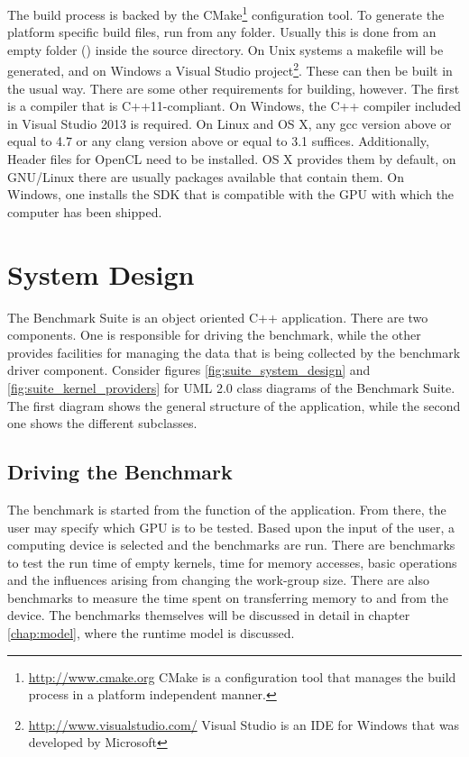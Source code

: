 The build process is backed by the CMake\footnote{\url{http://www.cmake.org} CMake is a configuration tool that manages the build process in a platform independent manner.} configuration tool. To generate the platform specific build files, run  from any folder. Usually this is done from an empty folder () inside the source directory. On Unix systems a makefile will be generated, and on Windows a Visual Studio project\footnote{\url{http://www.visualstudio.com/} Visual Studio is an IDE for Windows that was developed by Microsoft}. These can then be built in the usual way. There are some other requirements for building, however. The first is a compiler that is C++11-compliant. On Windows, the C++ compiler included in Visual Studio 2013 is required. On Linux and OS X, any gcc version above or equal to 4.7 or any clang version above or equal to 3.1 suffices. Additionally, Header files for OpenCL need to be installed. OS X provides them by default, on GNU/Linux there are usually packages available that contain them. On Windows, one installs the SDK that is compatible with the GPU with which the computer has been shipped. 
\newpage



\section{System Design}
\label{sect:suite_design}
The Benchmark Suite is an object oriented C++ application. There are two components. One is responsible for driving the benchmark, while the other provides facilities for managing the data that is being collected by the benchmark driver component. Consider figures \ref{fig:suite_system_design} and \ref{fig:suite_kernel_providers} for UML 2.0 class diagrams of the Benchmark Suite. The first diagram shows the general structure of the application, while the second one shows the different  subclasses.

\subsection{Driving the Benchmark}
\label{sect:suite_design_driver}

The benchmark is started from the  function of the application. From there, the user may specify which GPU is to be tested. Based upon the input of the user, a computing device is selected and the benchmarks are run. There are benchmarks to test the run time of empty kernels, time for memory accesses, basic operations and the influences arising from changing the work-group size. There are also benchmarks to measure the time spent on transferring memory to and from the device. The benchmarks themselves will be discussed in detail in chapter \ref{chap:model}, where the runtime model is discussed. \\
 
